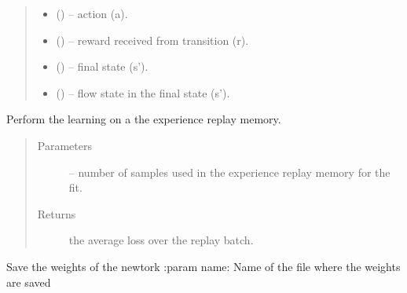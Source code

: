 \documentclass[letterpaper,10pt,english]{sphinxmanual}
\begin{document}
\begin{fulllineitems}
\begin{fulllineitems}
\begin{quote}
\begin{description}
\begin{itemize}
\item {} 
 () -- action (a).

\item {} 
 () -- reward received from transition (r).

\item {} 
 () -- final state (s').

\item {} 
 () -- flow state in the final state (s').

\end{itemize}

\end{description}\end{quote}

\end{fulllineitems}


\begin{fulllineitems}
\label{\detokenize{package2:policyLearning.PolicyLearner.replay}}
Perform the learning on a the experience replay memory.
\begin{quote}\begin{description}
\item[{Parameters}] \leavevmode
{} -- number of samples used in the experience replay memory for the fit.

\item[{Returns}] \leavevmode
the average loss over the replay batch.

\end{description}\end{quote}

\end{fulllineitems}


\begin{fulllineitems}
\label{\detokenize{package2:policyLearning.PolicyLearner.save}}
Save the weights of the newtork
:param name: Name of the file where the weights are saved

\end{fulllineitems}


\end{fulllineitems}
\end{document}
